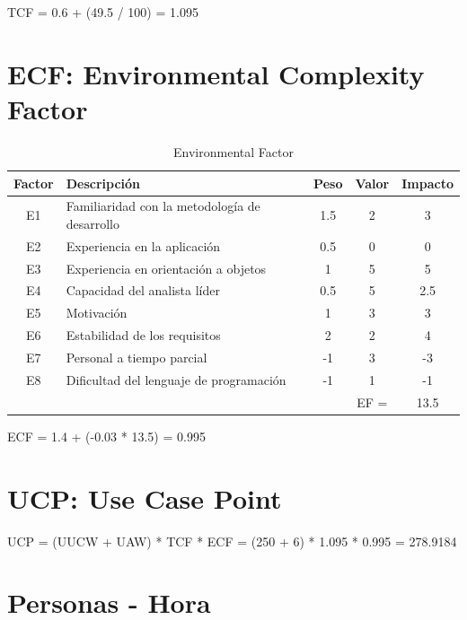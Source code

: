 \documentclass[12pt, a4paper, titlepage]{article}
\begin{document}
TCF = 0.6 + (49.5 / 100) = 1.095

\section{ECF: Environmental Complexity Factor}

\begin{table}[h]
	\begin{center}
		\begin{tabular}{|c|p{10cm}|c|c|c|}
			\hline
			Factor & Descripción & Peso & Valor & Impacto \\ \hline
			E1 & Familiaridad con la metodología de desarrollo & 1.5 & 2 & 3 \\ \hline
			E2 & Experiencia en la aplicación & 0.5 & 0 & 0 \\ \hline
			E3 & Experiencia en orientación a objetos & 1 & 5 & 5 \\ \hline
			E4 & Capacidad del analista líder & 0.5 & 5 & 2.5 \\ \hline
			E5 & Motivación & 1 & 3 & 3 \\ \hline
			E6 & Estabilidad de los requisitos & 2 & 2 & 4 \\ \hline
			E7 & Personal a tiempo parcial  & -1 & 3 & -3 \\ \hline
			E8 & Dificultad del lenguaje de programación & -1 & 1 & -1 \\ \hline
			& & & EF = & 13.5 \\ \hline
			
			
			
		\end{tabular}
		\caption{Environmental Factor}
	\end{center}
\end{table}

ECF = 1.4 + (-0.03 * 13.5) = 0.995

\section{UCP: Use Case Point}

UCP = (UUCW + UAW) * TCF * ECF 
= (250 + 6) * 1.095 * 0.995 
= 278.9184

\section{Personas - Hora}
\end{document}

